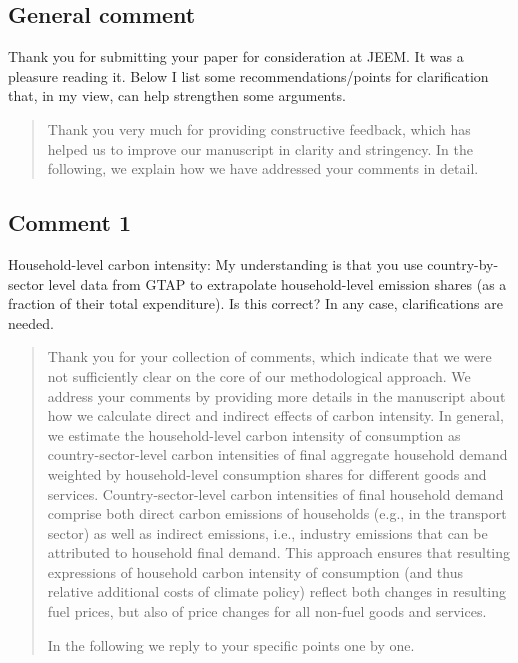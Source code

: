 \documentclass[11pt]{article}
\newenvironment{response}
{\begin{quote}\color{black}}
{\end{quote}}
\begin{document}
\subsection*{General comment}\label{comment_R2_0}

\begin{commentbox}
    Thank you for submitting your paper for consideration at JEEM. It was a pleasure reading it. Below I list some recommendations/points for clarification that, in my view, can help strengthen some arguments.
\end{commentbox}

\begin{response}
    Thank you very much for providing constructive feedback, which has helped us to improve our manuscript in clarity and stringency. In the following, we explain how we have addressed your comments in detail. 
\end{response}
    
\subsection*{Comment 1}\label{comment_R2_1}

\begin{commentbox}
    Household-level carbon intensity: My understanding is that you use country-by-sector level data from GTAP to extrapolate household-level emission shares (as a fraction of their total expenditure). Is this correct? In any case, clarifications are needed.
\end{commentbox}

\begin{response}
    Thank you for your collection of comments, which indicate that we were not sufficiently clear on the core of our methodological approach. We address your comments by providing more details in the manuscript about how we calculate direct and indirect effects of carbon intensity. In general, we estimate the household-level carbon intensity of consumption as country-sector-level carbon intensities of final aggregate household demand weighted by household-level consumption shares for different goods and services. Country-sector-level carbon intensities of final household demand comprise both direct carbon emissions of households (e.g., in the transport sector) as well as indirect emissions, i.e., industry emissions that can be attributed to household final demand. This approach ensures that resulting expressions of household carbon intensity of consumption (and thus relative additional costs of climate policy) reflect both changes in resulting fuel prices, but also of price changes for all non-fuel goods and services.

    In the following we reply to your specific points one by one. 

\end{response}
\end{document}
